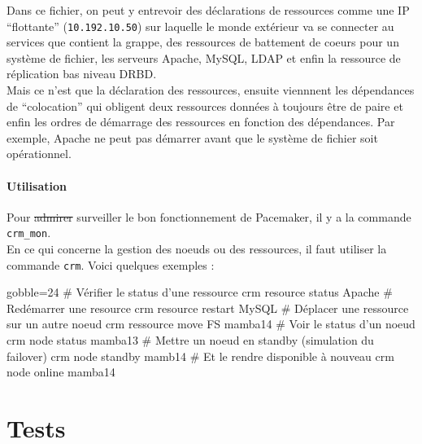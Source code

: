 \documentclass[11pt,a4paper]{report}
\begin{document}
                    Dans ce fichier, on peut y entrevoir des déclarations de ressources comme une IP ``flottante'' (\verb+10.192.10.50+) sur laquelle le monde extérieur va se connecter au services que contient la grappe, des ressources de battement de coeurs pour un système de fichier, les serveurs Apache, MySQL, LDAP et enfin la ressource de réplication bas niveau DRBD.\\
                    
                    Mais ce n'est que la déclaration des ressources, ensuite viennnent les dépendances de ``colocation'' qui obligent deux ressources données à toujours être de paire et enfin les ordres de démarrage des ressources en fonction des dépendances.
                    Par exemple, Apache ne peut pas démarrer avant que le système de fichier soit opérationnel.
            
                \subsection{Utilisation}
                
                    Pour \st{admirer} surveiller le bon fonctionnement de Pacemaker, il y a la commande \verb+crm_mon+.\\
                
                    En ce qui concerne la gestion des noeuds ou des ressources, il faut utiliser la commande \verb+crm+. Voici quelques exemples :\\
                
                    \begin{bashcode*}{gobble=24}
                        # Vérifier le status d'une ressource
                        crm resource status Apache
                        # Redémarrer une resource
                        crm resource restart MySQL
                        # Déplacer une ressource sur un autre noeud
                        crm ressource move FS mamba14
                        # Voir le status d'un noeud
                        crm node status mamba13
                        # Mettre un noeud en standby (simulation du failover)
                        crm node standby mamb14
                        # Et le rendre disponible à nouveau
                        crm node online mamba14
                    \end{bashcode*}

    \part{Tests}
\end{document}
